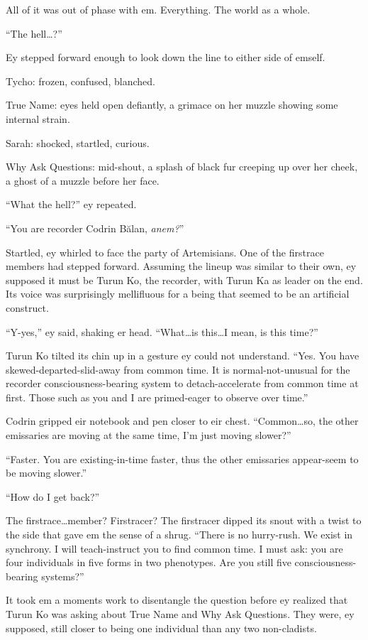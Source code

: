 All of it was out of phase with em. Everything. The world as a whole.

``The hell\ldots?''

Ey stepped forward enough to look down the line to either side of emself.

Tycho: frozen, confused, blanched.

True Name: eyes held open defiantly, a grimace on her muzzle showing some internal strain.

Sarah: shocked, startled, curious.

Why Ask Questions: mid-shout, a splash of black fur creeping up over her cheek, a ghost of a muzzle before her face.

``What the hell?'' ey repeated.

``You are recorder Codrin Bălan, \emph{anem?}''

Startled, ey whirled to face the party of Artemisians. One of the firstrace members had stepped forward. Assuming the lineup was similar to their own, ey supposed it must be Turun Ko, the recorder, with Turun Ka as leader on the end. Its voice was surprisingly mellifluous for a being that seemed to be an artificial construct.

``Y-yes,'' ey said, shaking er head. ``What\ldots is this\ldots I mean, is this time?''

Turun Ko tilted its chin up in a gesture ey could not understand. ``Yes. You have skewed-departed-slid-away from common time. It is normal-not-unusual for the recorder consciousness-bearing system to detach-accelerate from common time at first. Those such as you and I are primed-eager to observe over time.''

Codrin gripped eir notebook and pen closer to eir chest. ``Common\ldots so, the other emissaries are moving at the same time, I'm just moving slower?''

``Faster. You are existing-in-time faster, thus the other emissaries appear-seem to be moving slower.''

``How do I get back?''

The firstrace\ldots member? Firstracer? The firstracer dipped its snout with a twist to the side that gave em the sense of a shrug. ``There is no hurry-rush. We exist in synchrony. I will teach-instruct you to find common time. I must ask: you are four individuals in five forms in two phenotypes. Are you still five consciousness-bearing systems?''

It took em a moments work to disentangle the question before ey realized that Turun Ko was asking about True Name and Why Ask Questions. They were, ey supposed, still closer to being one individual than any two non-cladists.

